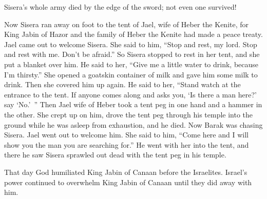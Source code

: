 {Sisera’s
whole
army
died by the edge
of the sword;
not
even
one
survived!
\par }{\PP {}Now Sisera
ran
away on foot
to
the tent
of Jael,
wife
of Heber
the Kenite,
for
King
Jabin
of Hazor
and the family
of Heber
the Kenite
had made a peace
treaty.
Jael
came out
to welcome
Sisera.
She said
to him,
“Stop
and rest, my lord.
Stop
and rest with me.
Don’t
be afraid.”
So Sisera stopped
to
rest in her tent,
and she put a blanket
over him.
He said
to her, “Give me
a little
water
to drink,
because
I’m thirsty.”
She opened
a goatskin
container of milk and gave him some milk
to drink.
Then she covered him up again.
He said
to her,
“Stand
watch at the entrance
to the tent.
If
anyone
comes
along and asks
you, ‘Is there
a man
here?’ say
‘No.’ ”
Then Jael
wife
of Heber
took
a tent peg
in one hand
and a hammer
in the other. She crept up
on him, drove
the tent peg
through his temple
into the ground
while
he was asleep
from exhaustion,
and he died.
Now
Barak
was chasing
Sisera.
Jael
went out
to welcome him.
She said
to him, “Come
here and I will show
you the
man
you
are searching
for.” He went
with her into
the tent, and there he saw
Sisera
sprawled
out dead
with the tent peg
in his temple.
\par }{\PP {}That day
God
humiliated
King
Jabin
of Canaan
before
the Israelites.
Israel’s
power
continued
to overwhelm
King
Jabin
of Canaan
until
they did away
with him.

\par }
